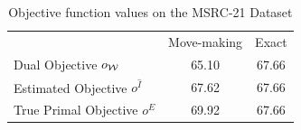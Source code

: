 \begin{table}
    \begin{center}
    \begin{tabularx}{\linewidth}{@{\extracolsep{\fill}}lcc}
    \toprule
                    & Move-making & Exact \\
    \cmidrule{1-3}
    Dual Objective $o_{\mathcal{W}}$ & 65.10 & 67.66  \\
    Estimated Objective $o^{\hat{I}}$ &  67.62& 67.66\\
    True Primal Objective $o^E$& 69.92& 67.66\\
    \bottomrule
    \end{tabularx}
    \end{center}
    \caption{Objective function values on the MSRC-21 Dataset}
\end{table}

    
